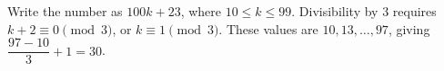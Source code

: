 Write the number as $100k+23$, where $10\le k\le99$. Divisibility by $3$ requires $k+2\equiv0\pmod3$, or $k\equiv1\pmod3$. These values are $10,13,\ldots,97$, giving $\dfrac{97-10}{3}+1=\boxed{30}$.
